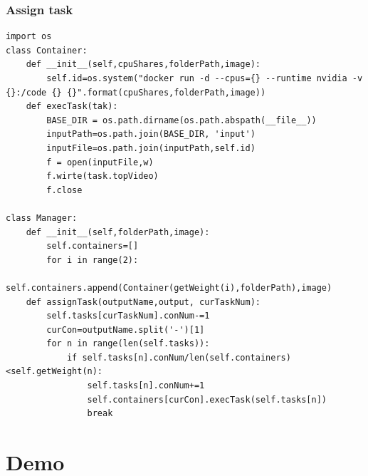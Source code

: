 \documentclass{article}
\begin{document}
            \subsubsection{Assign task}
                \begin{lstlisting}
import os
class Container:
    def __init__(self,cpuShares,folderPath,image):
        self.id=os.system("docker run -d --cpus={} --runtime nvidia -v  {}:/code {} {}".format(cpuShares,folderPath,image))   
    def execTask(tak):
        BASE_DIR = os.path.dirname(os.path.abspath(__file__))
        inputPath=os.path.join(BASE_DIR, 'input')
        inputFile=os.path.join(inputPath,self.id)
        f = open(inputFile,w) 
        f.wirte(task.topVideo)
        f.close

class Manager:
    def __init__(self,folderPath,image):
        self.containers=[]
        for i in range(2):
            self.containers.append(Container(getWeight(i),folderPath),image)
    def assignTask(outputName,output, curTaskNum):
        self.tasks[curTaskNum].conNum-=1
        curCon=outputName.split('-')[1]
        for n in range(len(self.tasks)):
            if self.tasks[n].conNum/len(self.containers)<self.getWeight(n):
                self.tasks[n].conNum+=1
                self.containers[curCon].execTask(self.tasks[n])
                break
                \end{lstlisting}
    \newpage
    \section{Demo}
\end{document}
